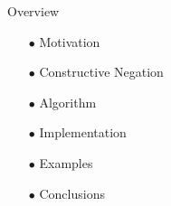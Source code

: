 \documentclass[pdf,slideColor,contemporain]{prosper}
\begin{document}
\begin{slide}{Overview}
\vspace{0.8cm}
        \begin{itemize}
                \item[{\blue $\bullet$}] Motivation
                \item[{\blue $\bullet$}] Constructive Negation
                \item[{\blue $\bullet$}] Algorithm
                \item[{\blue $\bullet$}] Implementation
                \item[{\blue $\bullet$}] Examples
                \item[$\bullet$] {\blue Conclusions}
        \end{itemize}
\end{slide}

\end{document}
